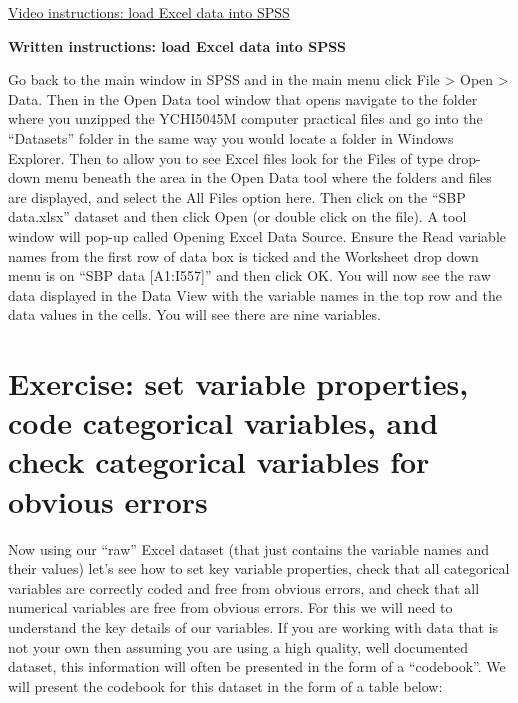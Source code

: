 \documentclass[
]{book}
\begin{document}
\href{https://youtu.be/IrLCr-Gp0sw}{Video instructions: load Excel data into SPSS}

\textbf{Written instructions: load Excel data into SPSS}

Go back to the main window in SPSS and in the main menu click File \textgreater{} Open \textgreater{} Data. Then in the Open Data tool window that opens navigate to the folder where you unzipped the YCHI5045M computer practical files and go into the ``Datasets'' folder in the same way you would locate a folder in Windows Explorer. Then to allow you to see Excel files look for the Files of type drop-down menu beneath the area in the Open Data tool where the folders and files are displayed, and select the All Files option here. Then click on the ``SBP data.xlsx'' dataset and then click Open (or double click on the file). A tool window will pop-up called Opening Excel Data Source. Ensure the Read variable names from the first row of data box is ticked and the Worksheet drop down menu is on ``SBP data {[}A1:I557{]}'' and then click OK. You will now see the raw data displayed in the Data View with the variable names in the top row and the data values in the cells. You will see there are nine variables.

\hypertarget{exercise-set-variable-properties-code-categorical-variables-and-check-categorical-variables-for-obvious-errors}{%
\section{Exercise: set variable properties, code categorical variables, and check categorical variables for obvious errors}\label{exercise-set-variable-properties-code-categorical-variables-and-check-categorical-variables-for-obvious-errors}}

Now using our ``raw'' Excel dataset (that just contains the variable names and their values) let's see how to set key variable properties, check that all categorical variables are correctly coded and free from obvious errors, and check that all numerical variables are free from obvious errors. For this we will need to understand the key details of our variables. If you are working with data that is not your own then assuming you are using a high quality, well documented dataset, this information will often be presented in the form of a ``codebook''. We will present the codebook for this dataset in the form of a table below:
\end{document}
